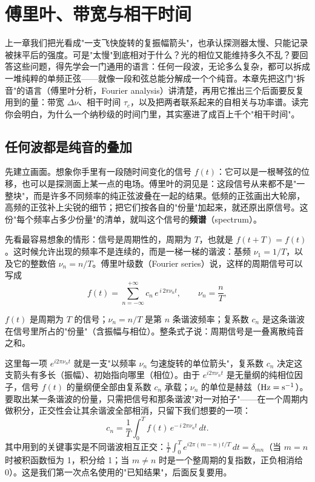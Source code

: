 \chapter{傅里叶、带宽与相干时间}
\label{chap:e02}

\begin{chapteropening}
上一章我们把光看成"一支飞快旋转的复振幅箭头"，也承认探测器太慢、只能记录被抹平后的强度。可是"太慢"到底相对于什么？光的相位又能维持多久不乱？要回答这些问题，得先学会一门通用的语言：任何一段波，无论多么复杂，都可以拆成一堆纯粹的单频正弦——就像一段和弦总能分解成一个个纯音。本章先把这门"拆音"的语言（傅里叶分析，Fourier analysis）讲清楚，再用它推出三个后面要反复用到的量：带宽 \(\Delta\nu\)、相干时间 \(\tau_c\)，以及把两者联系起来的自相关与功率谱。读完你会明白，为什么一个纳秒级的时间门里，其实塞进了成百上千个"相干时间"。
\end{chapteropening}

\section{任何波都是纯音的叠加}
\label{sec:e02-fourier-idea}

先建立画面。想象你手里有一段随时间变化的信号 \(f(t)\)：它可以是一根琴弦的位移，也可以是探测面上某一点的电场。傅里叶的洞见是：这段信号从来都不是"一整块"，而是许多不同频率的纯正弦波叠在一起的结果。低频的正弦画出大轮廓，高频的正弦补上尖锐的细节；把它们按各自的"份量"加起来，就还原出原信号。这份"每个频率占多少份量"的清单，就叫这个信号的\textbf{频谱}（spectrum）。

先看最容易想象的情形：信号是周期性的，周期为 \(T\)，也就是 \(f(t+T)=f(t)\)。这时候允许出现的频率不是连续的，而是一梯一梯的谐波：基频 \(\nu_1=1/T\)，以及它的整数倍 \(\nu_n=n/T\)。傅里叶级数（Fourier series）说，这样的周期信号可以写成
\begin{equation}
  f(t)=\sum_{n=-\infty}^{+\infty} c_n\,e^{\,i\,2\pi\nu_n t},
  \qquad
  \nu_n=\frac{n}{T},
  \label{eq:e02-fourier-series}
\end{equation}
\begin{formulaexplain}
\(f(t)\) 是周期为 \(T\) 的信号；\(\nu_n=n/T\) 是第 \(n\) 条谐波频率；复系数 \(c_n\) 是这条谐波在信号里所占的"份量"（含振幅与相位）。整条式子说：周期信号是一叠离散纯音之和。
\end{formulaexplain}
这里每一项 \(e^{i2\pi\nu_n t}\) 就是一支"以频率 \(\nu_n\) 匀速旋转的单位箭头"，复系数 \(c_n\) 决定这支箭头有多长（振幅）、初始指向哪里（相位）。由于 \(e^{i2\pi\nu_n t}\) 是无量纲的纯相位因子，信号 \(f(t)\) 的量纲便全部由复系数 \(c_n\) 承载；\(\nu_n\) 的单位是赫兹（\({\rm Hz}={\rm s^{-1}}\)）。要取出某一条谐波的份量，只需把信号和那条谐波"对一对拍子"——在一个周期内做积分，正交性会让其余谐波全部相消，只留下我们想要的一项：
\[
  c_n=\frac{1}{T}\int_{0}^{T} f(t)\,e^{-\,i\,2\pi\nu_n t}\,dt .
\]
其中用到的关键事实是不同谐波相互正交：\(\frac{1}{T}\int_0^T e^{i2\pi(m-n)t/T}\,dt=\delta_{mn}\)（当 \(m=n\) 时被积函数恒为 1，积分给 1；当 \(m\neq n\) 时是一个整周期的复指数，正负相消给 0）。这是我们第一次点名使用的"已知结果"，后面反复要用。

